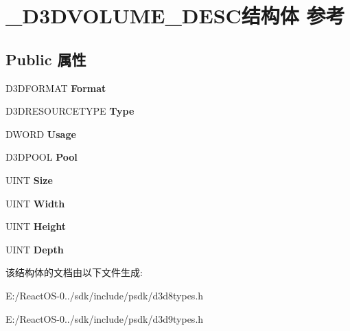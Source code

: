 \hypertarget{struct___d3_d_v_o_l_u_m_e___d_e_s_c}{}\section{\+\_\+\+D3\+D\+V\+O\+L\+U\+M\+E\+\_\+\+D\+E\+S\+C结构体 参考}
\label{struct___d3_d_v_o_l_u_m_e___d_e_s_c}
\subsection*{Public 属性}
\begin{DoxyCompactItemize}
\item 
\mbox{\label{struct___d3_d_v_o_l_u_m_e___d_e_s_c_a99b0db36428d1e4dc8f098b0852edc9a}} 
D3\+D\+F\+O\+R\+M\+AT {\bfseries Format}
\item 
\mbox{\label{struct___d3_d_v_o_l_u_m_e___d_e_s_c_a6bcd918d69133e0dd25ef2440bd29208}} 
D3\+D\+R\+E\+S\+O\+U\+R\+C\+E\+T\+Y\+PE {\bfseries Type}
\item 
\mbox{\label{struct___d3_d_v_o_l_u_m_e___d_e_s_c_a705263a326178a75862fa787dde91919}} 
D\+W\+O\+RD {\bfseries Usage}
\item 
\mbox{\label{struct___d3_d_v_o_l_u_m_e___d_e_s_c_aac40c1babb8d75df0b427baedf0ca240}} 
D3\+D\+P\+O\+OL {\bfseries Pool}
\item 
\mbox{\label{struct___d3_d_v_o_l_u_m_e___d_e_s_c_afde84e1c516a1935591fd46430c19ae5}} 
U\+I\+NT {\bfseries Size}
\item 
\mbox{\label{struct___d3_d_v_o_l_u_m_e___d_e_s_c_aa659c7934c7d697a6d4c1f22a1b23fc7}} 
U\+I\+NT {\bfseries Width}
\item 
\mbox{\label{struct___d3_d_v_o_l_u_m_e___d_e_s_c_a71f9f6dd8edb49c8b99c5cba0f7ce034}} 
U\+I\+NT {\bfseries Height}
\item 
\mbox{\label{struct___d3_d_v_o_l_u_m_e___d_e_s_c_ac17a51d84e8bb0e5992c71587bc27a46}} 
U\+I\+NT {\bfseries Depth}
\end{DoxyCompactItemize}


该结构体的文档由以下文件生成\+:\begin{DoxyCompactItemize}
\item 
E\+:/\+React\+O\+S-\/0../sdk/include/psdk/d3d8types.\+h\item 
E\+:/\+React\+O\+S-\/0../sdk/include/psdk/d3d9types.\+h\end{DoxyCompactItemize}
